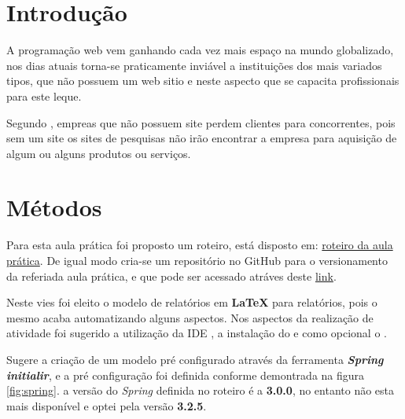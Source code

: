
\section{Introdução}

\par A programação web vem ganhando cada vez mais espaço na mundo globalizado, nos dias atuais torna-se praticamente inviável a instituições dos mais variados tipos, que não possuem um web sitio e neste aspecto que se capacita profissionais para este leque.
\par Segundo , empreas que não possuem site perdem clientes para concorrentes, pois sem um site os sites de pesquisas não irão encontrar a empresa para aquisição de algum ou alguns produtos ou serviços.




\section{Métodos}
\par Para esta aula prática foi proposto um roteiro, está disposto em: \href {https://github.com/ENGENHARIA-DE-SOFTWARE-UNOPAR/web-project/blob/main/Roteiro%20aula%20pr%C3%A1tica.pdf} {roteiro da aula prática}. De igual modo cria-se um repositório no GitHub para o versionamento da referiada aula prática, e que pode ser acessado atráves deste \href {https://github.com/ENGENHARIA-DE-SOFTWARE-UNOPAR/web-project} {link}.
\par Neste vies foi eleito o modelo de relatórios em \textbf{LaTeX} para relatórios, pois o mesmo acaba automatizando alguns aspectos. Nos aspectos da realização de atividade foi sugerido a utilização da IDE , a instalação do  e como opcional o .
\par Sugere a criação de um modelo pré configurado através da ferramenta \textit{\textbf{Spring initialir}}, e a pré configuração foi definida conforme demontrada na figura \ref{fig:spring}. a versão do \textit{Spring} definida no roteiro é a \textbf{3.0.0}, no entanto não esta mais disponível e optei pela versão \textbf{3.2.5}.


